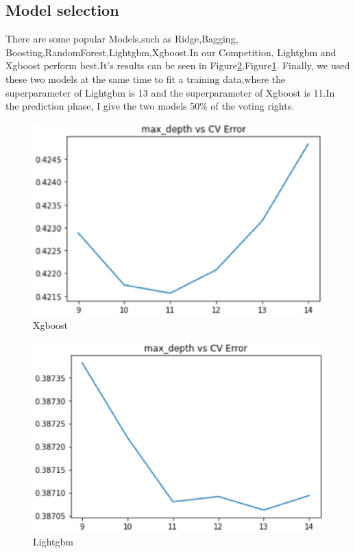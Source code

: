 \subsection{Model selection}
There are some popular Models,such as Ridge,Bagging, Boosting,RandomForest,Lightgbm,Xgboost.In our Competition, Lightgbm and Xgboost perform best.It's results can be seen in Figure\ref{24},Figure\ref{20}.
Finally, we used these two models at the same time to fit a training data,where the superparameter of Lightgbm is 13 and the superparameter of Xgboost is 11.In the prediction phase, I give the two models 50\% of the voting rights.
\begin{figure}[htbp]
	\centering
	\includegraphics[scale=0.4]{figures/20.eps}
	\caption{ Xgboost } \label{20}
\end{figure}
\begin{figure}[htbp]
	\centering
	\includegraphics[scale=0.4]{figures/24.eps}
	\caption{Lightgbm } \label{24}
\end{figure}
%
%

